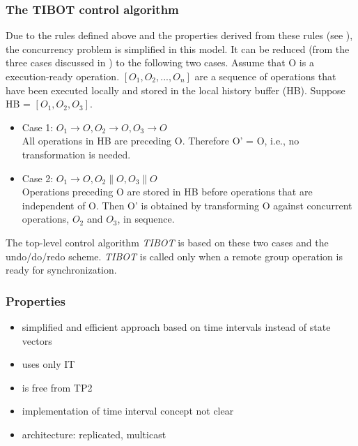 \subsubsection{The TIBOT control algorithm}
Due to the rules defined above and the properties derived from these rules (see \cite{tibot}), the concurrency problem is simplified in this model. It can be reduced (from the three cases discussed in \cite{sun98b}) to the following two cases. Assume that O is a execution-ready operation. $[O_{1},O_{2},...,O_{n}]$ are a sequence of operations that have been executed locally and stored in the local history buffer (HB). Suppose HB = $[O_{1},O_{2},O_{3}]$.
\begin{itemize}
 \item Case 1: $O_{1} \rightarrow O, O_{2} \rightarrow O, O_{3} \rightarrow O$ \\
 All operations in HB are preceding O. Therefore O' = O, i.e., no transformation is needed.
 \item Case 2: $O_{1} \rightarrow O, O_{2} \parallel O, O_{3} \parallel O$ \\
 Operations preceding O are stored in HB before operations that are independent of O. Then O' is obtained by transforming O against concurrent operations, $O_{2}$ and $O_{3}$, in sequence.
\end{itemize}

The top-level control algorithm \emph{TIBOT} is based on these two cases and the undo/do/redo scheme. \emph{TIBOT} is called only when a remote group operation is ready for synchronization.


\subsubsection{Properties}
\begin{itemize}
 \item simplified and efficient approach based on time intervals instead of state vectors
 \item uses only IT
 \item is free from TP2
 \item implementation of time interval concept not clear
 \item architecture: replicated, multicast
\end{itemize}
